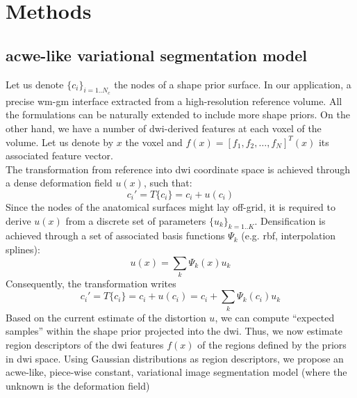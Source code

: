 \section{Methods}
\label{sec:methods}
%
\subsection{\acl{acwe}-like variational segmentation model}
%
Let us denote $\{c_i\}_{i=1..N_c}$ the nodes of a shape prior surface. In
our application, a precise \ac{wm}-\ac{gm} interface extracted from a
high-resolution reference volume. All the formulations can be naturally
extended to include more shape priors. On the other hand, we have a 
number of \ac{dwi}-derived features at each
voxel of the volume. Let us denote by $x$ the voxel and 
$f(x) = [ f_1, f_2, \ldots, f_N]^T(x)$ its associated feature vector.\\
%
The transformation from reference into \ac{dwi} coordinate space is 
achieved through a dense deformation field $u(x)$, such that:
%
\begin{equation}
c_i' = T\{c_i\} = c_i + u(c_i)
\end{equation}
% 
Since the nodes of the anatomical surfaces might lay off-grid, it is 
required to derive $u(x)$ from a discrete set of parameters $\{u_k\}_{k=1..K}$.
Densification is achieved through a set of associated basis functions 
$\Psi_k$ (e.g. rbf, interpolation splines):
%
\begin{equation}
u(x) = \sum_k \Psi_k(x) u_k
\end{equation}
%
Consequently, the transformation writes
%
\begin{equation}
\label{eq:transformation}
c_i' = T\{c_i\} = c_i + u(c_i) = c_i + \sum_k \Psi_k(c_i)u_k
\end{equation} 
%
%
Based on the current estimate of the distortion $u$, we can compute 
``expected samples'' within the shape prior projected into the \ac{dwi}.
Thus, we now estimate region descriptors of the \ac{dwi} features 
$f(x)$ of the regions defined by the priors in \ac{dwi} space.
%
Using Gaussian distributions as region descriptors, we propose an
\ac{acwe}-like, piece-wise constant, variational image segmentation
model (where the unknown is the deformation field)
